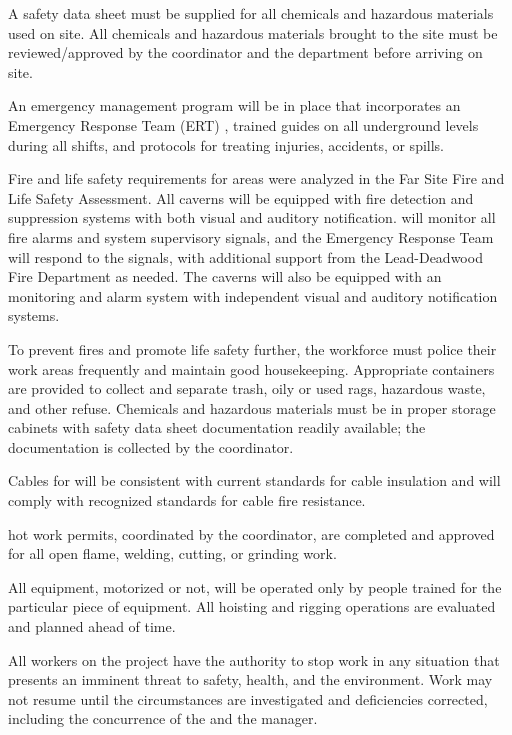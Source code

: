 A safety data sheet must be supplied for all chemicals and
hazardous materials used on site. All chemicals and hazardous
materials brought to the  site must be reviewed/approved by the
  coordinator and the  
department before arriving on site.

An emergency management program will be in place that incorporates an Emergency 
Response Team (ERT) ,  trained guides on all underground levels during all shifts, and protocols for treating injuries, accidents, or spills.

Fire and life safety requirements for  areas
were analyzed in the  Far Site Fire and Life
Safety Assessment. All caverns will be equipped with fire detection
and suppression systems with both visual and auditory notification.  
 will monitor all fire alarms and system supervisory signals, and the  Emergency Response Team 
will respond to the signals, with additional support from the Lead-Deadwood Fire
Department as needed.  The caverns will also be equipped
with an  monitoring and alarm system with independent visual and
auditory notification systems.

To prevent fires and promote life safety further, the workforce must  
police their work areas frequently and maintain good housekeeping. 
Appropriate containers are provided to collect and separate trash, oily or used rags, hazardous waste, and other refuse.
Chemicals and hazardous materials must be in proper storage cabinets
with safety data sheet documentation readily available; the documentation is collected by the
  coordinator.  

Cables for  will be
consistent with current \fnal standards for cable insulation and will 
comply with recognized standards for cable fire resistance.

\fnal hot work permits, coordinated by the 
 coordinator, are completed and approved for all open
flame, welding, cutting, or grinding work.  

All equipment, motorized or not, will be operated only by people trained for
the particular piece of equipment. All hoisting and rigging operations are evaluated and planned ahead of time.

All workers on the  project have the
authority to stop work in any situation that presents an imminent
threat to safety, health, and the environment. Work may not resume
until the circumstances are investigated and deficiencies corrected,
including the concurrence of the  
and the   manager.



